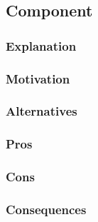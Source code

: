\subsection{Component}
\subsubsection{Explanation}

\subsubsection{Motivation}

\subsubsection{Alternatives}

\subsubsection{Pros}

\subsubsection{Cons}

\subsubsection{Consequences}
